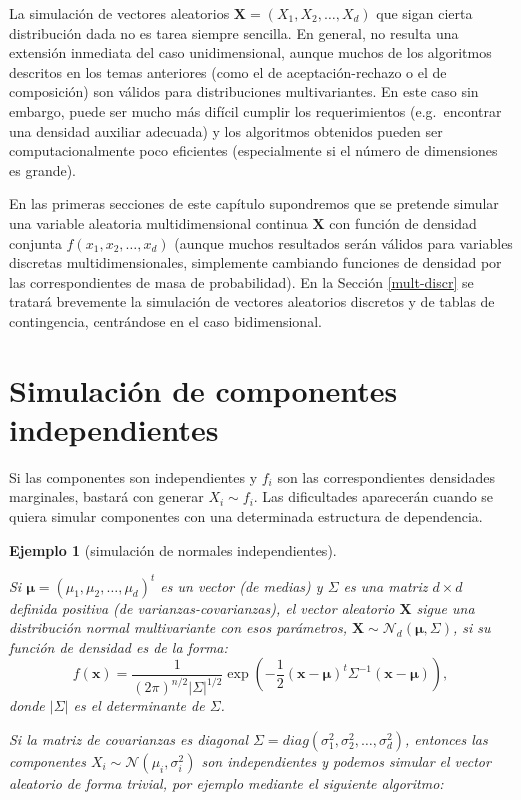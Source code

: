 \documentclass[
]{book}
\theoremstyle{break}
\newtheorem{example}{Ejemplo}[chapter]
\theoremstyle{nonumberplain}
\begin{document}
La simulación de vectores aleatorios \(\mathbf{X} =\left( X_1,X_2,\ldots,X_d\right)\) que sigan cierta distribución dada no es tarea siempre sencilla.
En general, no resulta una extensión inmediata del caso unidimensional, aunque muchos de los algoritmos descritos en los temas anteriores (como el de aceptación-rechazo o el de composición) son válidos para distribuciones multivariantes.
En este caso sin embargo, puede ser mucho más difícil cumplir los requerimientos (e.g.~encontrar una densidad auxiliar adecuada) y los algoritmos obtenidos pueden ser computacionalmente poco eficientes (especialmente si el número de dimensiones es grande).

En las primeras secciones de este capítulo supondremos que se pretende simular una variable aleatoria multidimensional continua \(\mathbf{X}\) con función de densidad conjunta \(f\left( x_1, x_2, \ldots , x_d\right)\) (aunque muchos resultados serán válidos para variables discretas multidimensionales, simplemente cambiando funciones de densidad por las correspondientes de masa de probabilidad).
En la Sección \ref{mult-discr} se tratará brevemente la simulación de vectores aleatorios discretos y de tablas de contingencia, centrándose en el caso bidimensional.

\hypertarget{simulaciuxf3n-de-componentes-independientes}{%
\section{Simulación de componentes independientes}\label{simulaciuxf3n-de-componentes-independientes}}

Si las componentes son independientes y \(f_i\) son las correspondientes densidades marginales, bastará con generar \(X_i \sim f_i\).
Las dificultades aparecerán cuando se quiera simular componentes con una determinada estructura de dependencia.

\begin{example}[simulación de normales independientes]
\protect\hypertarget{exm:normind}{}\label{exm:normind}

Si \(\boldsymbol\mu =\left( \mu_1,\mu_2,\ldots,\mu_d\right)^t\) es un vector (de medias) y
\(\Sigma\) es una matriz \(d \times d\) definida positiva (de varianzas-covarianzas), el vector aleatorio \(\mathbf{X}\) sigue una distribución normal multivariante con esos parámetros,
\(\mathbf{X} \sim \mathcal{N}_d\left( \boldsymbol\mu,\Sigma \right)\),
si su función de densidad es de la forma:
\[f(\mathbf x) = \frac{1}{(2\pi)^{n/2}|\Sigma|^{1/2}}
\exp \left( -\frac{1}{2} ( \mathbf x - \boldsymbol \mu)^t \Sigma^{-1} (\mathbf x - \boldsymbol \mu)
\right),\]
donde \(| \Sigma |\) es el determinante de \(\Sigma\).

Si la matriz de covarianzas es diagonal \(\Sigma=diag\left( \sigma_1^2,\sigma_2^2,\ldots,\sigma_d^2\right)\),
entonces las componentes \(X_i \sim \mathcal{N}\left( \mu_i,\sigma_i^2\right)\)
son independientes y podemos simular el vector aleatorio de forma trivial, por ejemplo mediante el siguiente algoritmo:
\end{example}
\end{document}
